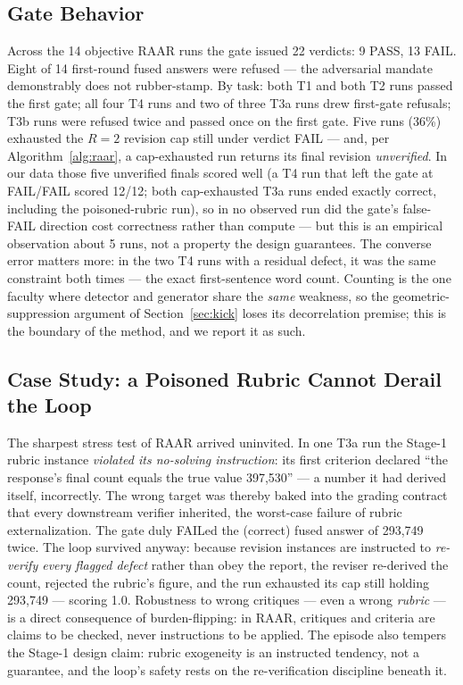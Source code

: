 \documentclass[journal]{IEEEtran}
\newcommand{\method}{RAAR}
\begin{document}
\subsection{Gate Behavior}
\label{sec:gate-analysis}
Across the 14 objective \method{} runs the gate issued 22 verdicts: 9 PASS,
13 FAIL. Eight of 14 first-round fused answers were refused --- the
adversarial mandate demonstrably does not rubber-stamp. By task: both T1
and both T2 runs passed the first gate; all four T4 runs and two of three
T3a runs drew first-gate refusals; T3b runs were refused twice and passed
once on the first gate. Five runs (36\%) exhausted the $R{=}2$ revision
cap still under verdict FAIL --- and, per Algorithm~\ref{alg:raar}, a
cap-exhausted run returns its final revision \emph{unverified}. In our
data those five unverified finals scored well (a T4 run that left the gate
at FAIL/FAIL scored 12/12; both cap-exhausted T3a runs ended exactly
correct, including the poisoned-rubric run), so in no observed run did the
gate's false-FAIL direction cost correctness rather than compute --- but
this is an empirical observation about 5 runs, not a property the design
guarantees. The converse error matters more: in the two T4 runs with a
residual defect, it was the same constraint both times --- the exact
first-sentence word count. Counting is the one
faculty where detector and generator share the \emph{same} weakness, so the
geometric-suppression argument of Section~\ref{sec:kick} loses its
decorrelation premise; this is the boundary of the method, and we report it
as such.

\subsection{Case Study: a Poisoned Rubric Cannot Derail the Loop}
\label{sec:rubric-case}
The sharpest stress test of \method{} arrived uninvited. In one T3a run
the Stage-1 rubric instance \emph{violated its no-solving instruction}:
its first criterion declared ``the response's final count equals the true
value 397{,}530'' --- a number it had derived itself, incorrectly. The
wrong target was thereby baked into the grading contract that every
downstream verifier inherited, the worst-case failure of rubric
externalization. The gate duly FAILed the (correct) fused answer of
293{,}749 twice. The loop survived anyway: because revision instances are
instructed to \emph{re-verify every flagged defect} rather than obey the
report, the reviser re-derived the count, rejected the rubric's figure,
and the run exhausted its cap still holding 293{,}749 --- scoring 1.0.
Robustness to wrong critiques --- even a wrong \emph{rubric} --- is a
direct consequence of burden-flipping: in \method{}, critiques and
criteria are claims to be checked, never instructions to be applied. The
episode also tempers the Stage-1 design claim: rubric exogeneity is an
instructed tendency, not a guarantee, and the loop's safety rests on the
re-verification discipline beneath it.
\end{document}
